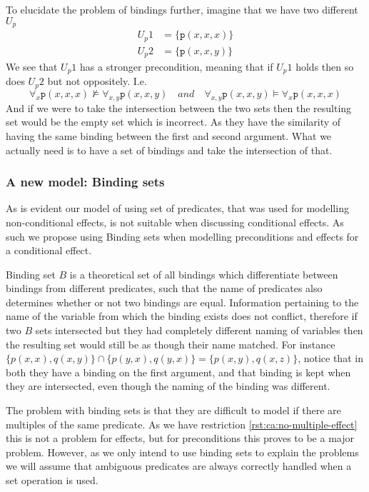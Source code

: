 \documentclass[../Master.tex]{subfiles}
\begin{document}
\begin{example}\label{ex:ca:nonbinding-intersection-model}
    To elucidate the problem of bindings further, imagine that we have two different $U_p$
    \begin{align*}
        U_p1 &= \{ \texttt{p}(x, x, x) \} \\
        U_p2 &= \{ \texttt{p}(x, x, y) \}
    \end{align*}
    We see that $U_p1$ has a stronger precondition, meaning that if $U_p1$ holds then so does $U_p2$ but not oppositely. I.e.\ 
    \begin{equation*}
    \forall_{x} \texttt{p}(x, x, x) \nvDash \forall_{x, y} \texttt{p}(x, x, y)  \quad and \quad
     \forall_{x, y} \texttt{p}(x, x, y) \vDash \forall_{x} \texttt{p}(x, x, x) 
    \end{equation*}
    And if we were to take the intersection between the two sets then the resulting set would be the empty set which is incorrect. As they have the similarity of having the same binding between the first and second argument. What we actually need is to have a set of bindings and take the intersection of that.
\end{example}

\subsubsection{A new model: Binding sets}
As is evident our model of using set of predicates, that was used for modelling non-conditional effects, is not suitable when discussing conditional effects. As such we propose using Binding sets when modelling preconditions and effects for a conditional effect.

\begin{definition}\label{thm:ca:binding-set}
	Binding set $B$ is a theoretical set of all bindings which differentiate between bindings from different predicates, such that the name of predicates also determines whether or not two bindings are equal. Information pertaining to the name of the variable from which the binding exists does not conflict, therefore if two $B$ sets intersected but they had completely different naming of variables then the resulting set would still be as though their name matched.
	For instance $\{p(x,x), q(x,y)\} \cap \{p(y,x), q(y,x)\} = \{p(x,y), q(x,z)\}$, notice that in both they have a binding on the first argument, and that binding is kept when they are intersected, even though the naming of the binding was different.
\end{definition}
The problem with binding sets is that they are difficult to model if there are multiples of the same predicate. As we have restriction \ref{rst:ca:no-multiple-effect} this is not a problem for effects, but for preconditions this proves to be a major problem. However, as we only intend to use binding sets to explain the problems we will assume that ambiguous predicates are always correctly handled when a set operation is used.
\end{document}
